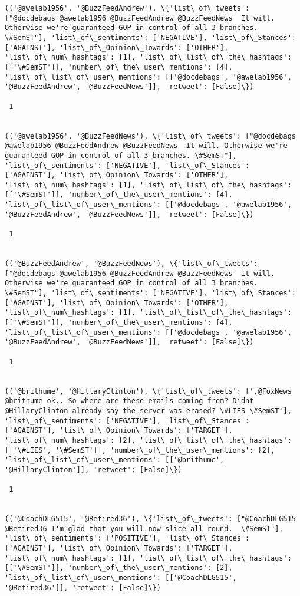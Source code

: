 \documentclass[11pt]{article}
\begin{document}
\begin{Verbatim}[commandchars=\\\{\}]
(('@awelab1956', '@BuzzFeedAndrew'), \{'list\_of\_tweets': ["@docdebags @awelab1956 @BuzzFeedAndrew @BuzzFeedNews  It will. Otherwise we're guaranteed GOP in control of all 3 branches. \#SemST"], 'list\_of\_sentiments': ['NEGATIVE'], 'list\_of\_Stances': ['AGAINST'], 'list\_of\_Opinion\_Towards': ['OTHER'], 'list\_of\_num\_hashtags': [1], 'list\_of\_list\_of\_the\_hashtags': [['\#SemST']], 'number\_of\_the\_user\_mentions': [4], 'list\_of\_list\_of\_user\_mentions': [['@docdebags', '@awelab1956', '@BuzzFeedAndrew', '@BuzzFeedNews']], 'retweet': [False]\})

 1
 

(('@awelab1956', '@BuzzFeedNews'), \{'list\_of\_tweets': ["@docdebags @awelab1956 @BuzzFeedAndrew @BuzzFeedNews  It will. Otherwise we're guaranteed GOP in control of all 3 branches. \#SemST"], 'list\_of\_sentiments': ['NEGATIVE'], 'list\_of\_Stances': ['AGAINST'], 'list\_of\_Opinion\_Towards': ['OTHER'], 'list\_of\_num\_hashtags': [1], 'list\_of\_list\_of\_the\_hashtags': [['\#SemST']], 'number\_of\_the\_user\_mentions': [4], 'list\_of\_list\_of\_user\_mentions': [['@docdebags', '@awelab1956', '@BuzzFeedAndrew', '@BuzzFeedNews']], 'retweet': [False]\})

 1
 

(('@BuzzFeedAndrew', '@BuzzFeedNews'), \{'list\_of\_tweets': ["@docdebags @awelab1956 @BuzzFeedAndrew @BuzzFeedNews  It will. Otherwise we're guaranteed GOP in control of all 3 branches. \#SemST"], 'list\_of\_sentiments': ['NEGATIVE'], 'list\_of\_Stances': ['AGAINST'], 'list\_of\_Opinion\_Towards': ['OTHER'], 'list\_of\_num\_hashtags': [1], 'list\_of\_list\_of\_the\_hashtags': [['\#SemST']], 'number\_of\_the\_user\_mentions': [4], 'list\_of\_list\_of\_user\_mentions': [['@docdebags', '@awelab1956', '@BuzzFeedAndrew', '@BuzzFeedNews']], 'retweet': [False]\})

 1
 

(('@brithume', '@HillaryClinton'), \{'list\_of\_tweets': ['.@FoxNews @brithume ok.. So where are these emails coming from? Didnt @HillaryClinton already say the server was erased? \#LIES \#SemST'], 'list\_of\_sentiments': ['NEGATIVE'], 'list\_of\_Stances': ['AGAINST'], 'list\_of\_Opinion\_Towards': ['TARGET'], 'list\_of\_num\_hashtags': [2], 'list\_of\_list\_of\_the\_hashtags': [['\#LIES', '\#SemST']], 'number\_of\_the\_user\_mentions': [2], 'list\_of\_list\_of\_user\_mentions': [['@brithume', '@HillaryClinton']], 'retweet': [False]\})

 1
 

(('@CoachDLG515', '@Retired36'), \{'list\_of\_tweets': ["@CoachDLG515 @Retired36 I'm glad that you will now slice all round.  \#SemST"], 'list\_of\_sentiments': ['POSITIVE'], 'list\_of\_Stances': ['AGAINST'], 'list\_of\_Opinion\_Towards': ['TARGET'], 'list\_of\_num\_hashtags': [1], 'list\_of\_list\_of\_the\_hashtags': [['\#SemST']], 'number\_of\_the\_user\_mentions': [2], 'list\_of\_list\_of\_user\_mentions': [['@CoachDLG515', '@Retired36']], 'retweet': [False]\})


\end{Verbatim}
\end{document}

